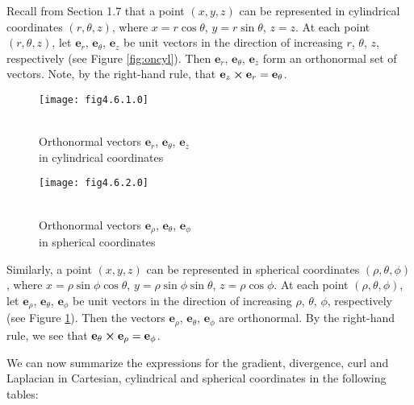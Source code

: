 Recall from Section 1.7 that a point $(x,y,z)$ can be represented in cylindrical coordinates $(r, \theta , z)$, where
$x=r\cos \theta$, $y=r\sin \theta$, $z=z$. At each point $(r, \theta , z)$, let $\mathbf{e}_{r}$, $\mathbf{e}_{\theta}$,
$\mathbf{e}_{z}$ be unit vectors in the direction of increasing $r$, $\theta$, $z$, respectively (see Figure
\ref{fig:oncyl}). 
Then $\mathbf{e}_{r}$, $\mathbf{e}_{\theta}$, $\mathbf{e}_{z}$ form an orthonormal set of vectors.
Note, by the right-hand rule, that $\mathbf{e}_{z} \bm{\times} \mathbf{e}_{r}=\mathbf{e}_{\theta}$.
\begin{figure}[h]
\begin{minipage}[t]{7.5cm}
 \begin{center}
  \texttt{[image: fig4.6.1.0]}
 \end{center}
 \caption[]{\\Orthonormal vectors $\mathbf{e}_{r}$, $\mathbf{e}_{\theta}$, $\mathbf{e}_{z}$\\in cylindrical coordinates}
 \label{fig:oncyl}
\end{minipage}
\begin{minipage}[t]{7.5cm}
 \begin{center}
  \texttt{[image: fig4.6.2.0]}
 \end{center}
 \caption[]{\\Orthonormal vectors $\mathbf{e}_{\rho}$, $\mathbf{e}_{\theta}$,
  $\mathbf{e}_{\phi}$\\in spherical coordinates}
 \label{fig:onsph}
\end{minipage}
\end{figure}

Similarly, a point $(x,y,z)$ can be represented in spherical coordinates $(\rho, \theta , \phi)$, where
$x=\rho\sin \phi \cos \theta$, $y=\rho\sin \phi \sin \theta$, $z=\rho\cos \phi$. At each point $(\rho, \theta , \phi)$,
let $\mathbf{e}_{\rho}$, $\mathbf{e}_{\theta}$, $\mathbf{e}_{\phi}$ be unit vectors in the direction of increasing
$\rho$, $\theta$, $\phi$, respectively (see Figure \ref{fig:onsph}). Then the vectors $\mathbf{e}_{\rho}$,
$\mathbf{e}_{\theta}$, $\mathbf{e}_{\phi}$ are orthonormal. By the right-hand rule, we see that
$\mathbf{e}_{\theta} \bm{\times} \mathbf{e}_{\rho}=\mathbf{e}_{\phi}$.

We can now summarize the expressions for the gradient, divergence, curl and Laplacian in Cartesian, cylindrical and
spherical coordinates in the following tables:


